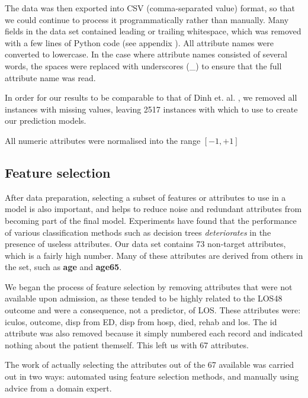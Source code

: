 The data was then exported into CSV (comma-separated value) format, so that
we could continue to process it programmatically rather than manually. Many
fields in the data set contained leading or trailing whitespace, which was
removed with a few lines of Python code (see appendix ). All attribute names were converted to lowercase. In the case
where attribute names consisted of several words, the spaces were replaced
with underscores (\_) to ensure that the full attribute name was read.

In order for our results to be comparable to that of Dinh
et. al. \citep{Dinh2013a}, we removed all instances with missing values,
leaving 2517 instances with which to use to create our prediction models.

All numeric attributes were normalised into the range $[-1,+1]$ 

\subsection{Feature selection}
After data preparation, selecting a subset of features or attributes to use
in a model is also important, and helps to reduce noise and redundant
attributes from becoming part of the final model. Experiments have found that
the performance of various classification methods such as decision trees
\textit{deteriorates} in the presence of useless attributes.
Our data set contains 73
non-target attributes, which is a fairly high number. Many of these attributes
are derived from others in the set, such as \textbf{age} and \textbf{age65}.

We began the process of feature selection by removing attributes that were
not available upon admission, as these tended to be highly related to the
LOS48 outcome and were a consequence, not a predictor, of LOS. These attributes
were: iculos, outcome, disp from ED, disp from hosp, died, rehab and los.
The id attribute was also removed because it simply numbered each record and
indicated nothing about the patient themself. This left us with 67 attributes.

The work of actually selecting the attributes out of the 67 available was
carried out in two ways: automated using feature selection methods, and
manually using advice from a domain expert.

